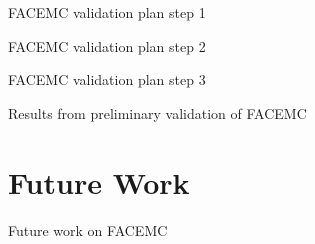 \documentclass{beamer}
\begin{document}
\begin{frame}{FACEMC validation plan step 1}

\end{frame}

\begin{frame}{FACEMC validation plan step 2}

\end{frame}

\begin{frame}{FACEMC validation plan step 3}

\end{frame}

\begin{frame}{Results from preliminary validation of FACEMC}

\end{frame}

\section{Future Work}
\begin{frame}{Future work on FACEMC}

\end{frame}

\end{document}
